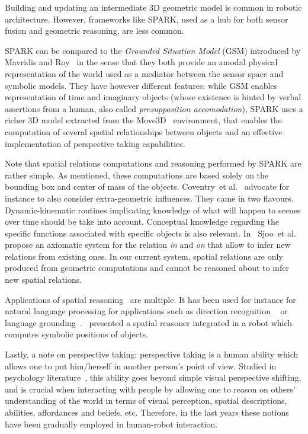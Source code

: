\documentclass{svmult}
\newcommand{\etal}{et al.\xspace}
\begin{document}
Building and updating an intermediate 3D geometric model is common in robotic
architecture. However, frameworks like SPARK, used as a hub for both sensor
fusion and geometric reasoning, are less common.

SPARK can be compared to the \emph{Grounded Situation Model} (GSM) introduced
by Mavridis and Roy~\cite{Mavridis2005} in the sense that they both provide an
amodal physical representation of the world used as a mediator between the
sensor space and symbolic models. They have however different features: while
GSM enables representation of time and imaginary objects (whose existence is
hinted by verbal assertions from a human, also called \emph{presupposition
accomodation}), SPARK uses a richer 3D model extracted from the
Move3D~\cite{Simeon2001} environment, that enables the computation of several
spatial relationships between objects and an effective implementation of
perspective taking capabilities.

Note that spatial relations computations and reasoning performed by SPARK are
rather simple.  As mentioned, these computations are based solely on the
bounding box and center of mass of the objects.
Coventry~\etal~\cite{Coventry2005} advocate for instance to also consider
extra-geometric influences. They came in two flavours. Dynamic-kinematic
routines implicating knowledge of what will happen to scenes over time should
be take into account.  Conceptual knowledge regarding the specific functions
associated with specific objects is also relevant. In~\cite{SjooIcar2011}
Sjoo~\etal propose an axiomatic system for the relation \emph{in} and \emph{on}
that allow to infer new relations from existing ones. In our current system,
spatial relations are only produced from geometric computations and cannot be
reasoned about to infer new spatial relations.

Applications of spatial reasoning~\cite{O'Keefe1999} are multiple. It has been
used for instance for natural language processing for applications such as
direction recognition ~\cite{Kollar2010,Matuszek2010} or language
grounding~\cite{Tellex2010}.~\cite{Skubic2004} presented a spatial reasoner
integrated in a robot which computes symbolic positions of objects.

Lastly, a note on perspective taking: perspective taking is a human ability
which allows one to put him/herself in another person's point of view. Studied
in psychology literature~\cite{Flavell1992,Tversky1999}, this ability goes
beyond simple visual perspective shifting, and is crucial when interacting with
people by allowing one to reason on others' understanding of the world in terms
of visual perception, spatial descriptions, abilities, affordances and beliefs,
etc.  Therefore, in the last years these notions have been gradually employed
in human-robot interaction.
\end{document}
